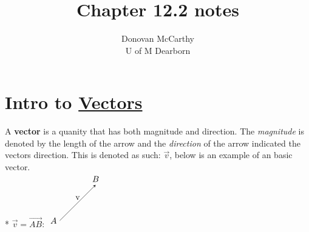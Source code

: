 \documentclass[12pt]{article}
\title{\vspace{-5.9cm}Chapter 12.2 notes}
\author{Donovan McCarthy\\
	U of M Dearborn}
\date
\begin{document}
\fontsize{11}{5}

\section*{\center Intro to \underline{Vectors}}
A \textbf{vector} is a quanity that has both magnitude and direction. The \textit{magnitude} is denoted by the length of the arrow and the \textit{direction} of the arrow indicated the vectors direction. This is denoted as such: $\vec{v}$, below is an example of an basic vector.  
\\*
$\vec{v}= \vec{AB}$:
$ 
\begin{tikzpicture}[x=0.5cm,y=0.5cm,z=0.5cm,>=stealth]
\draw[->] (xyz cs:z=0) node[left] {$A$} --node[above]{v} (xyz cs:z=3) node[above] {$B$};
\end{tikzpicture}
$ 
\end{document}
